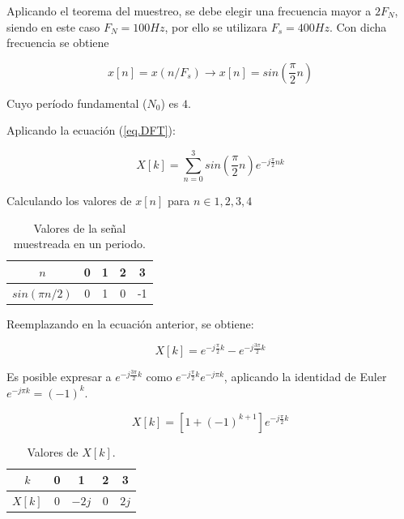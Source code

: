 \documentclass{article}
\begin{document}
    Aplicando el teorema del muestreo, se debe elegir una frecuencia mayor a $2F_N$, siendo 
    en este caso $F_N=100Hz$, por ello se utilizara $F_s=400Hz$. Con dicha frecuencia se obtiene 

    \begin{equation}
        x[n]=x(n/F_s) \rightarrow x[n]= sin\left( \frac{\pi}{2} n\right)
    \end{equation}

    Cuyo período fundamental ($N_0$) es $4$.

    Aplicando la ecuación (\ref{eq.DFT}):

    \begin{equation}
        X[k]= \sum_{n=0}^{3} sin\left( \frac{\pi}{2} n\right) e^{-j\frac{\pi}{2} nk}
    \end{equation}

    Calculando los valores de $x[n]$ para $n\in {1, 2, 3 ,4}$

    \begin{table}[H]
        \centering
            \begin{tabular}{|c|c|c|c|c|}
            \hline
            $n$ & 0 & 1 & 2 & 3  \\ \hline
            $sin(\pi n/2)$ & 0 & 1 & 0 & -1 \\ \hline
            \end{tabular}
        \caption{Valores de la señal muestreada en un periodo.}
    \end{table}

    Reemplazando en la ecuación anterior, se obtiene:

    \begin{equation}
        X[k]= e^{-j\frac{\pi}{2}k} - e^{-j\frac{ 3 \pi}{2}k}
    \end{equation}

    Es posible expresar a $e^{-j\frac{ 3 \pi}{2}k}$ como $e^{-j \frac{\pi }{2}k}e^{-j\pi k}$, aplicando la identidad de Euler 
    $e^{-j \pi k}= (-1)^k$. 

    \begin{equation}
        X[k]= [ 1 + (-1)^{k+1} ] e^{ -j \frac{\pi }{2} k }
    \end{equation}

    \begin{table}[H]
        \centering
        \begin{tabular}{|c|c|c|c|c|}
            \hline
            $k$ & 0 & 1 & 2 & 3  \\ \hline
            $X[k]$ & 0 & $-2j$ & 0 & $2j$ \\ \hline
            \end{tabular}
        \caption{Valores de $X[k]$.}
        \label{tab.xk}
    \end{table}
\end{document}
